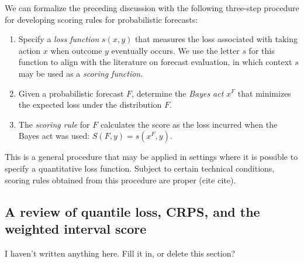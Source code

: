 \documentclass{article}
\begin{document}
We can formalize the preceding discussion with the following three-step procedure for developing scoring rules for probabilistic forecasts:
\begin{enumerate}
\item Specify a \emph{loss function} $s(x, y)$ that measures the loss associated with taking action $x$ when outcome $y$ eventually occurs. We use the letter $s$ for this function to align with the literature on forecast evaluation, in which context $s$ may be used as a \emph{scoring function}.
\item Given a probabilistic forecast $F$, determine the \emph{Bayes act} $x^F$ that minimizes the expected loss under the distribution $F$.
\item The \emph{scoring rule} for $F$ calculates the score as the loss incurred when the Bayes act was used: $S(F, y) = s(x^F, y)$.
\end{enumerate}
This is a general procedure that may be applied in settings where it is possible to specify a quantitative loss function. Subject to certain technical conditions, scoring rules obtained from this procedure are proper (cite cite).



\subsection{A review of quantile loss, CRPS, and the weighted interval score}

I haven't written anything here.  Fill it in, or delete this section?


\end{document}
